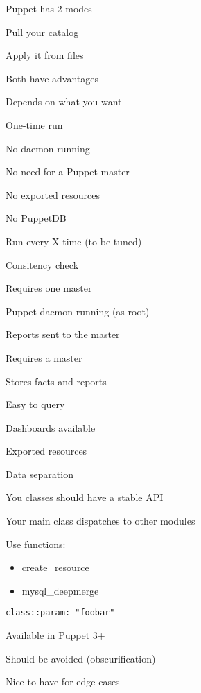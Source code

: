 \begin{iframe}
\item Puppet has 2 modes
\item Pull your catalog
\item Apply it from files
\item Both have advantages
\item Depends on what you want
\end{iframe}
\begin{iframe}
\item One-time run
\item No daemon running
\item No need for a Puppet master
\item No exported resources
\item No PuppetDB
\end{iframe}
\begin{iframe}
\item Run every X time (to be tuned)
\item Consitency check
\item Requires one master
\item Puppet daemon running (as root)
\item Reports sent to the master
\end{iframe}

\begin{iframe}[PuppetDB]
\item Requires a master
\item Stores facts and reports
\item Easy to query
\item Dashboards available
\item Exported resources
\end{iframe}

\begin{iframe}[Hiera]
\item Data separation
\item You classes should have a stable API
\item Your main class dispatches to other modules
\item Use functions:
\begin{itemize}
    \item create\_resource
    \item mysql\_deepmerge
\end{itemize}
\end{iframe}
\begin{iframe}
\item{\texttt{class::param: "foobar"}}
\item Available in Puppet 3+
\item Should be avoided (obscurification)
\item Nice to have for edge cases
\end{iframe}

